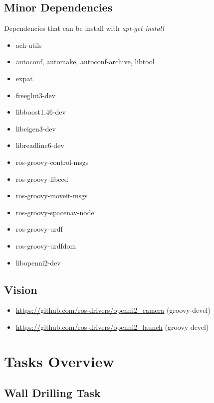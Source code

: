 \documentclass[letterpaper, 10 pt]{report}
\begin{document}
\section{Minor Dependencies}
Dependencies that can be install with \textit{apt-get install}
\begin{itemize}
  \item ach-utils
  \item autoconf, automake, autoconf-archive, libtool
  \item expat
  \item freeglut3-dev
  \item libboost1.46-dev
  \item libeigen3-dev
  \item libreadline6-dev
  \item ros-groovy-control-msgs
  \item ros-groovy-libccd
  \item ros-groovy-moveit-msgs
  \item ros-groovy-spacenav-node
  \item ros-groovy-urdf
  \item ros-groovy-urdfdom
  \item libopenni2-dev
\end{itemize}
\section{Vision}
\begin{itemize}
  \item \url{https://github.com/ros-drivers/openni2\_camera} (groovy-devel)
  \item \url{https://github.com/ros-drivers/openni2\_launch} (groovy-devel)
\end{itemize}
\newpage

%
\chapter{Tasks Overview}
\section{Wall Drilling Task}\label{wall-drilling-task}
\end{document}
